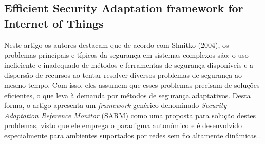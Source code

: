 \documentclass[tid,table]{texufpel} %
\begin{document}

\subsection{Efficient Security Adaptation framework for Internet of Things} %

Neste artigo os autores destacam que de acordo com Shnitko (2004)\nocite{shnitko04}, os problemas principais e típicos da segurança em sistemas complexos são: o uso ineficiente e inadequado de métodos e ferramentas de segurança disponíveis e a dispersão de recursos ao tentar resolver diversos problemas de segurança ao mesmo tempo. Com isso, eles assumem que esses problemas precisam de soluções eficientes, o que leva à demanda por métodos de segurança adaptativos. Desta forma, o artigo apresenta um \textit{framework} genérico denominado \textit{Security Adaptation Reference Monitor} (SARM) como uma proposta para solução destes problemas, visto que ele emprega o paradigma autonômico e é desenvolvido especialmente para ambientes suportados por redes sem fio altamente dinâmicas \cite{elmaliki16}.
		
\end{document}

